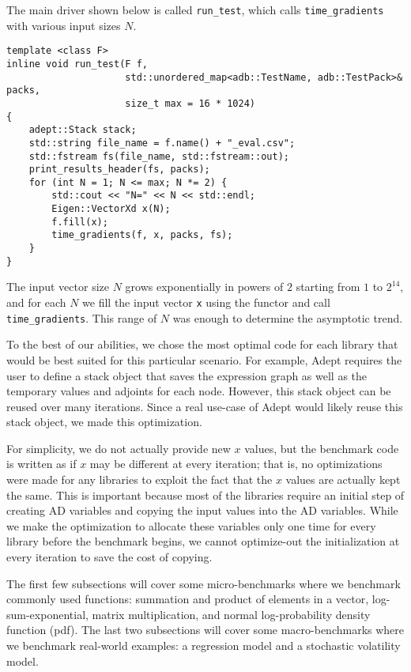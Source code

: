 The main driver shown below is called \verb|run_test|, which calls
\verb|time_gradients| with various input sizes $N$.
\begin{lstlisting}[style=customcpp]
template <class F>
inline void run_test(F f, 
                     std::unordered_map<adb::TestName, adb::TestPack>& packs,
                     size_t max = 16 * 1024) 
{
    adept::Stack stack;
    std::string file_name = f.name() + "_eval.csv";
    std::fstream fs(file_name, std::fstream::out);
    print_results_header(fs, packs);
    for (int N = 1; N <= max; N *= 2) {
        std::cout << "N=" << N << std::endl;
        Eigen::VectorXd x(N);
        f.fill(x);
        time_gradients(f, x, packs, fs);
    }
}
\end{lstlisting}
The input vector size $N$ grows exponentially in powers of $ 2$ starting from $ 1$ to
$2^{14}$, and for each $N$ we fill the input vector \verb|x| using the functor and call \verb|time_gradients|.
This range of $N$ was enough to determine the asymptotic trend.

To the best of our abilities, we chose the most optimal code for each library 
that would be best suited for this particular scenario.
For example, Adept requires the user to define a stack object that saves the 
expression graph as well as the temporary values and adjoints for each node.
However, this stack object can be reused over many iterations.
Since a real use-case of Adept would likely reuse this stack object, we made this optimization.

For simplicity, we do not actually provide new $x$ values, but the benchmark code
is written as if $x$ may be different at every iteration; that is,
no optimizations were made for any libraries to exploit the fact that 
the $x$ values are actually kept the same.
This is important because most of the libraries require an initial step of creating AD variables
and copying the input values into the AD variables.
While we make the optimization to allocate these variables only one time for every library before the benchmark begins,
we cannot optimize-out the initialization
at every iteration to save the cost of copying.

The first few subsections will cover some micro-benchmarks where we benchmark commonly used functions: 
summation and product of elements in a vector, 
log-sum-exponential, 
matrix multiplication, 
and normal log-probability density function (pdf).
The last two subsections will cover some macro-benchmarks where we benchmark real-world examples: 
a regression model and a stochastic volatility model.













